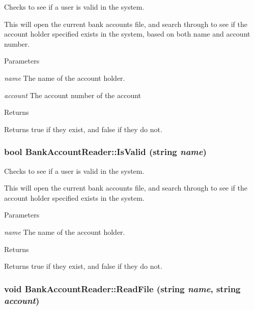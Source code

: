 Checks to see if a user is valid in the system. 

This will open the current bank accounts file, and search through to see if the account holder specified exists in the system, based on both name and account number.


\begin{DoxyParams}{Parameters}
\item[{\em name}]The name of the account holder.\item[{\em account}]The account number of the account\end{DoxyParams}
\begin{DoxyReturn}{Returns}

\end{DoxyReturn}
Returns true if they exist, and false if they do not. \hypertarget{classBankAccountReader_abde5fcd9a4f59f7e3de810ea51b2a0b5}{
\subsubsection[{IsValid}]{\setlength{\rightskip}{0pt plus 5cm}bool BankAccountReader::IsValid (string {\em name})}}
\label{classBankAccountReader_abde5fcd9a4f59f7e3de810ea51b2a0b5}


Checks to see if a user is valid in the system. 

This will open the current bank accounts file, and search through to see if the account holder specified exists in the system.


\begin{DoxyParams}{Parameters}
\item[{\em name}]The name of the account holder.\end{DoxyParams}
\begin{DoxyReturn}{Returns}

\end{DoxyReturn}
Returns true if they exist, and false if they do not. \hypertarget{classBankAccountReader_a117e91a7d1efefa4bf0b5205dcaef3c3}{
\subsubsection[{ReadFile}]{\setlength{\rightskip}{0pt plus 5cm}void BankAccountReader::ReadFile (string {\em name}, \/  string {\em account})}}
\label{classBankAccountReader_a117e91a7d1efefa4bf0b5205dcaef3c3}


